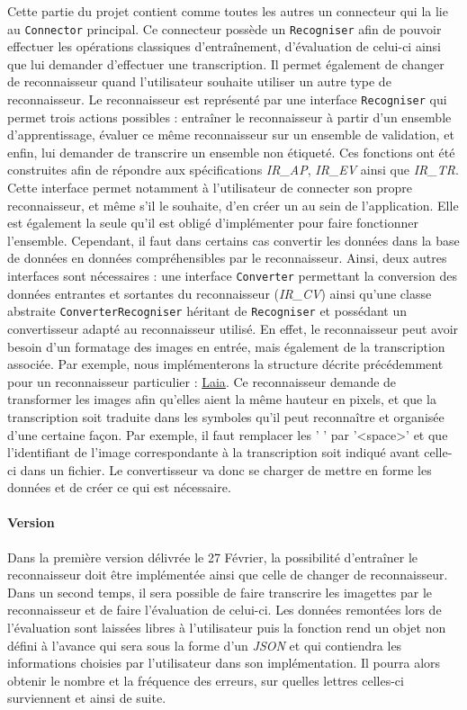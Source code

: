 Cette partie du projet contient comme toutes les autres un connecteur qui la lie au \texttt{Connector} principal. Ce connecteur possède un \texttt{Recogniser} afin de pouvoir effectuer les opérations classiques d'entraînement, d'évaluation de celui-ci ainsi que lui demander d'effectuer une transcription. Il permet également de changer de reconnaisseur quand l'utilisateur souhaite utiliser un autre type de reconnaisseur.
\newline{}
Le reconnaisseur est représenté par une interface \texttt{Recogniser} qui permet trois actions possibles : entraîner le reconnaisseur à partir d'un ensemble d'apprentissage, évaluer ce même reconnaisseur sur un ensemble de validation, et enfin, lui demander de transcrire un ensemble non étiqueté. Ces fonctions ont été construites afin de répondre aux spécifications \textit{IR\_AP}, \textit{IR\_EV} ainsi que \textit{IR\_TR}.
Cette interface permet notamment à l'utilisateur de connecter son propre reconnaisseur, et même s'il le souhaite, d'en créer un au sein de l'application. Elle est également la seule qu'il est obligé d'implémenter pour faire fonctionner l'ensemble. Cependant, il faut dans certains cas convertir les données dans la base de données en données compréhensibles par le reconnaisseur. Ainsi, deux autres interfaces sont nécessaires : une interface \texttt{Converter} permettant la conversion des données entrantes et sortantes du reconnaisseur (\textit{IR\_CV}) ainsi qu'une classe abstraite \texttt{ConverterRecogniser} héritant de \texttt{Recogniser} et possédant un convertisseur adapté au reconnaisseur utilisé. En effet, le reconnaisseur peut avoir besoin d'un formatage des images en entrée, mais également de la transcription associée. Par exemple, nous implémenterons la structure décrite précédemment pour un reconnaisseur particulier : \href{https://github.com/jpuigcerver/Laia}{Laia}. Ce reconnaisseur demande de transformer les images afin qu'elles aient la même hauteur en pixels, et que la transcription soit traduite dans les symboles qu'il peut reconnaître et organisée d'une certaine façon. Par exemple, il faut remplacer les ' ' par '<space>' et que l'identifiant de l'image correspondante à la transcription soit indiqué avant celle-ci dans un fichier. Le convertisseur va donc se charger de mettre en forme les données et de créer ce qui est nécessaire.
\paragraph{Version}
Dans la première version délivrée le 27 Février, la possibilité d'entraîner le reconnaisseur doit être implémentée ainsi que celle de changer de reconnaisseur. Dans un second temps, il sera possible de faire transcrire les imagettes par le reconnaisseur et de faire l'évaluation de celui-ci. Les données remontées lors de l'évaluation sont laissées libres à l'utilisateur puis la fonction rend un objet non défini à l'avance qui sera sous la forme d'un \textit{JSON} et qui contiendra les informations choisies par l'utilisateur dans son implémentation. Il pourra alors obtenir le nombre et la fréquence des erreurs, sur quelles lettres celles-ci surviennent et ainsi de suite.

